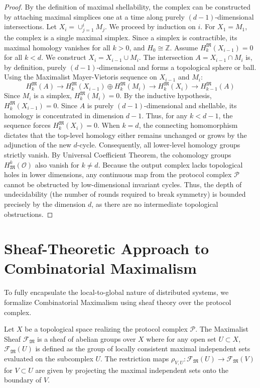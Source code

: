 \begin{proof}
By the definition of maximal shellability, the complex can be constructed by attaching maximal simplices one at a time along purely $(d-1)$-dimensional intersections. 
Let $X_i = \cup_{j=1}^i M_j$. We proceed by induction on $i$.
For $X_1 = M_1$, the complex is a single maximal simplex. Since a simplex is contractible, its maximal homology vanishes for all $k > 0$, and $H_0 \cong \mathbb{Z}$.
Assume $H_k^{\mathfrak{M}}(X_{i-1}) = 0$ for all $k < d$. We construct $X_i = X_{i-1} \cup M_i$. The intersection $A = X_{i-1} \cap M_i$ is, by definition, purely $(d-1)$-dimensional and forms a topological sphere or ball.
Using the Maximalist Mayer-Vietoris sequence on $X_{i-1}$ and $M_i$:
\[
H_k^{\mathfrak{M}}(A) \to H_k^{\mathfrak{M}}(X_{i-1}) \oplus H_k^{\mathfrak{M}}(M_i) \to H_k^{\mathfrak{M}}(X_i) \to H_{k-1}^{\mathfrak{M}}(A)
\]
Since $M_i$ is a simplex, $H_k^{\mathfrak{M}}(M_i) = 0$. By the inductive hypothesis, $H_k^{\mathfrak{M}}(X_{i-1}) = 0$. Since $A$ is purely $(d-1)$-dimensional and shellable, its homology is concentrated in dimension $d-1$. Thus, for any $k < d-1$, the sequence forces $H_k^{\mathfrak{M}}(X_i) = 0$.
When $k = d$, the connecting homomorphism dictates that the top-level homology either remains unchanged or grows by the adjunction of the new $d$-cycle. Consequently, all lower-level homology groups strictly vanish.
By Universal Coefficient Theorem, the cohomology groups $H^k_{\mathfrak{M}}(\mathcal{O})$ also vanish for $k \neq d$. 
Because the output complex lacks topological holes in lower dimensions, any continuous map from the protocol complex $\mathcal{P}$ cannot be obstructed by low-dimensional invariant cycles. Thus, the depth of undecidability (the number of rounds required to break symmetry) is bounded precisely by the dimension $d$, as there are no intermediate topological obstructions.
\end{proof}

\section{Sheaf-Theoretic Approach to Combinatorial Maximalism}

To fully encapsulate the local-to-global nature of distributed systems, we formalize Combinatorial Maximalism using sheaf theory over the protocol complex.

\begin{definition}
Let $X$ be a topological space realizing the protocol complex $\mathcal{P}$. The Maximalist Sheaf $\mathscr{F}_{\mathfrak{M}}$ is a sheaf of abelian groups over $X$ where for any open set $U \subset X$, $\mathscr{F}_{\mathfrak{M}}(U)$ is defined as the group of locally consistent maximal independent sets evaluated on the subcomplex $U$. The restriction maps $\rho_{V,U}: \mathscr{F}_{\mathfrak{M}}(U) \to \mathscr{F}_{\mathfrak{M}}(V)$ for $V \subset U$ are given by projecting the maximal independent sets onto the boundary of $V$.
\end{definition}

